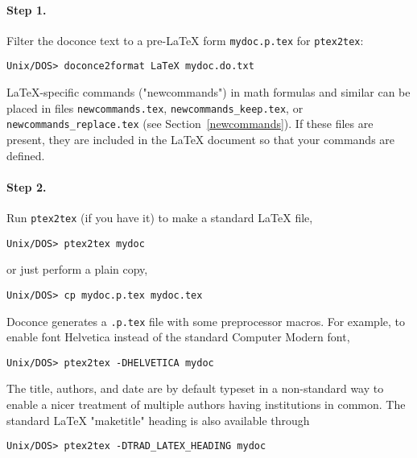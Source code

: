 \documentclass{article}
\begin{document}
\paragraph{Step 1.}
Filter the doconce text to a pre-{\LaTeX} form {\fontsize{10pt}{10pt}\verb!mydoc.p.tex!} for
     {\fontsize{10pt}{10pt}\verb!ptex2tex!}:
\vspace{4pt}
\begin{Verbatim}[numbers=none,frame=lines,label=\fbox{{\tiny Terminal}},fontsize=\fontsize{9pt}{9pt},
labelposition=topline,framesep=2.5mm,framerule=0.7pt]
Unix/DOS> doconce2format LaTeX mydoc.do.txt
\end{Verbatim}
{\LaTeX}-specific commands ("newcommands") in math formulas and similar
can be placed in files {\fontsize{10pt}{10pt}\verb!newcommands.tex!}, {\fontsize{10pt}{10pt}\verb!newcommands_keep.tex!}, or
{\fontsize{10pt}{10pt}\verb!newcommands_replace.tex!} (see Section~\ref{newcommands}). 
If these files are present, they are included in the {\LaTeX} document 
so that your commands are defined.

\paragraph{Step 2.}
Run {\fontsize{10pt}{10pt}\verb!ptex2tex!} (if you have it) to make a standard {\LaTeX} file,
\vspace{4pt}
\begin{Verbatim}[numbers=none,frame=lines,label=\fbox{{\tiny Terminal}},fontsize=\fontsize{9pt}{9pt},
labelposition=topline,framesep=2.5mm,framerule=0.7pt]
Unix/DOS> ptex2tex mydoc
\end{Verbatim}
or just perform a plain copy,
\vspace{4pt}
\begin{Verbatim}[numbers=none,frame=lines,label=\fbox{{\tiny Terminal}},fontsize=\fontsize{9pt}{9pt},
labelposition=topline,framesep=2.5mm,framerule=0.7pt]
Unix/DOS> cp mydoc.p.tex mydoc.tex
\end{Verbatim}
Doconce generates a {\fontsize{10pt}{10pt}\verb!.p.tex!} file with some preprocessor macros.
For example, to enable font Helvetica instead of the standard
Computer Modern font,
\vspace{4pt}
\begin{Verbatim}[numbers=none,frame=lines,label=\fbox{{\tiny Terminal}},fontsize=\fontsize{9pt}{9pt},
labelposition=topline,framesep=2.5mm,framerule=0.7pt]
Unix/DOS> ptex2tex -DHELVETICA mydoc
\end{Verbatim}
The title, authors, and date are by default typeset in a non-standard
way to enable a nicer treatment of multiple authors having
institutions in common. The standard {\LaTeX} "maketitle" heading
is also available through
\vspace{4pt}
\begin{Verbatim}[numbers=none,frame=lines,label=\fbox{{\tiny Terminal}},fontsize=\fontsize{9pt}{9pt},
labelposition=topline,framesep=2.5mm,framerule=0.7pt]
Unix/DOS> ptex2tex -DTRAD_LATEX_HEADING mydoc
\end{Verbatim}
\end{document}
